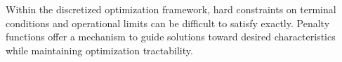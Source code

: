 Within the discretized optimization framework, hard constraints on terminal conditions and operational limits can be difficult to satisfy exactly. Penalty functions offer a mechanism to guide solutions toward desired characteristics while maintaining optimization tractability.
